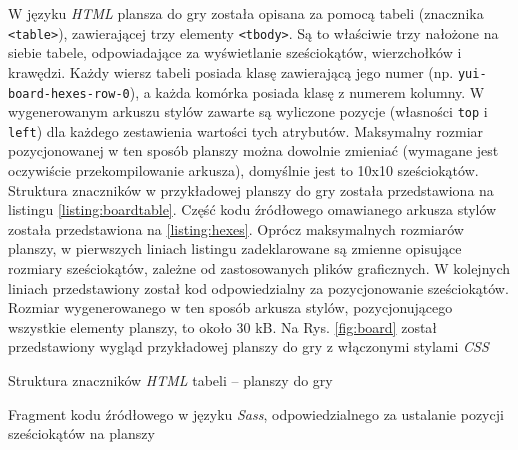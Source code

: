 \documentclass[a4paper,12pt]{article}
\providecommand{\imref}[1]{Rys. \ref{#1}} %
\begin{document}
W języku \emph{HTML} plansza do gry została opisana za pomocą tabeli
(znacznika \texttt{<table>}), zawierającej trzy elementy
\texttt{<tbody>}. Są to właściwie trzy nałożone na siebie tabele,
odpowiadające za wyświetlanie sześciokątów, wierzchołków i
krawędzi. Każdy wiersz tabeli posiada klasę zawierającą jego numer
(np. \texttt{yui-board-hexes-row-0}), a każda komórka posiada klasę z
numerem kolumny. W wygenerowanym arkuszu stylów zawarte są wyliczone
pozycje (własności \texttt{top} i \texttt{left}) dla każdego
zestawienia wartości tych atrybutów. Maksymalny rozmiar pozycjonowanej
w ten sposób planszy można dowolnie zmieniać (wymagane jest oczywiście
przekompilowanie arkusza), domyślnie jest to 10x10
sześciokątów. Struktura znaczników w przykładowej planszy do gry
została przedstawiona na listingu \ref{listing:boardtable}. Część kodu
źródłowego omawianego arkusza stylów została przedstawiona na
\ref{listing:hexes}. Oprócz maksymalnych rozmiarów planszy, w
pierwszych liniach listingu zadeklarowane są zmienne opisujące
rozmiary sześciokątów, zależne od zastosowanych plików graficznych. W
kolejnych liniach przedstawiony został kod odpowiedzialny za
pozycjonowanie sześciokątów. Rozmiar wygenerowanego w ten sposób
arkusza stylów, pozycjonującego wszystkie elementy planszy, to około
30 kB. Na \imref{fig:board} został przedstawiony wygląd przykładowej
planszy do gry z włączonymi stylami \emph{CSS}

\begin{listing}
  
  \caption{Struktura znaczników \emph{HTML} tabeli -- planszy do gry}
  \label{listing:boardtable}
\end{listing}

\begin{listing}
  
  \caption{Fragment kodu źródłowego w języku \emph{Sass},
    odpowiedzialnego za ustalanie pozycji sześciokątów na planszy}
  \label{listing:hexes}
\end{listing}
\end{document}
